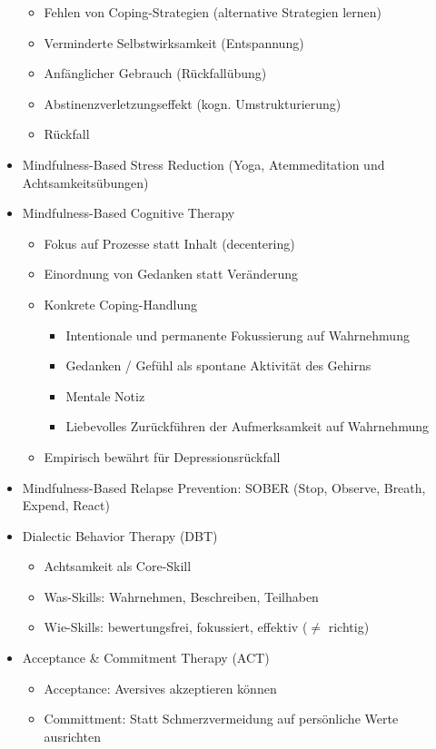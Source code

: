 \documentclass[11pt, paper=a4, twocolumn]{scrartcl}
\begin{document}
\begin{itemize}
\begin{itemize}
					\item Fehlen von Coping-Strategien (alternative Strategien lernen)
					\item Verminderte Selbstwirksamkeit (Entspannung)
					\item Anfänglicher Gebrauch (Rückfallübung)
					\item Abstinenzverletzungseffekt (kogn. Umstrukturierung)
					\item Rückfall
				\end{itemize}
			\item Mindfulness-Based Stress Reduction (Yoga, Atemmeditation und Achtsamkeitsübungen)
			\item Mindfulness-Based Cognitive Therapy
				\begin{itemize}
					\item Fokus auf Prozesse statt Inhalt (decentering)
					\item Einordnung von Gedanken statt Veränderung
					\item Konkrete Coping-Handlung
						\begin{itemize}
							\item Intentionale und permanente Fokussierung auf Wahrnehmung
							\item Gedanken / Gefühl als spontane Aktivität des Gehirns
							\item Mentale Notiz
							\item Liebevolles Zurückführen der Aufmerksamkeit auf Wahrnehmung
						\end{itemize}
					\item Empirisch bewährt für Depressionsrückfall
				\end{itemize}
			\item Mindfulness-Based Relapse Prevention: SOBER (Stop, Observe, Breath, Expend, React)
			\item Dialectic Behavior Therapy (DBT)
				\begin{itemize}
					\item Achtsamkeit als Core-Skill
					\item Was-Skills: Wahrnehmen, Beschreiben, Teilhaben
					\item Wie-Skills: bewertungsfrei, fokussiert, effektiv ($\neq$ richtig)
				\end{itemize}
			\item Acceptance \& Commitment Therapy (ACT)
				\begin{itemize}
					\item Acceptance: Aversives akzeptieren können
					\item Committment: Statt Schmerzvermeidung auf persönliche Werte ausrichten

\end{itemize}
\end{itemize}
\end{document}
